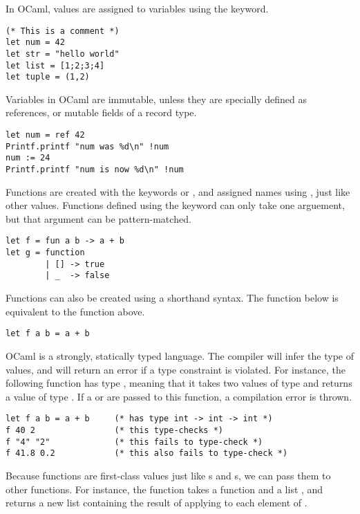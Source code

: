 In OCaml, values are assigned to variables using the 
keyword.

\begin{lstlisting}
(* This is a comment *)
let num = 42
let str = "hello world"
let list = [1;2;3;4]
let tuple = (1,2)
\end{lstlisting}

Variables in OCaml are immutable, unless they are specially defined as
references, or mutable fields of a record type.

\begin{lstlisting}
let num = ref 42
Printf.printf "num was %d\n" !num
num := 24
Printf.printf "num is now %d\n" !num
\end{lstlisting}

Functions are created with the keywords  or ,
and assigned names using , just like other values. Functions
defined using the  keyword can only take one arguement,
but that argument can be pattern-matched.

\begin{lstlisting}
let f = fun a b -> a + b
let g = function
        | [] -> true
        | _  -> false
\end{lstlisting}

Functions can also be created using a shorthand  syntax. The
function  below is equivalent to the function  above.

\begin{lstlisting}
let f a b = a + b
\end{lstlisting}

OCaml is a strongly, statically typed language. The compiler will
infer the type of values, and will return an error if a type
constraint is violated. For instance, the following function 
has type , meaning that it takes two values of
type  and returns a value of type . If a
 or  are passed to this function, a
compilation error is thrown.

\begin{lstlisting}
let f a b = a + b     (* has type int -> int -> int *)
f 40 2                (* this type-checks *)
f "4" "2"             (* this fails to type-check *)
f 41.8 0.2            (* this also fails to type-check *)
\end{lstlisting}

Because functions are first-class values just like s and
s, we can pass them to other functions. For instance, the
function  takes a function  and a list
, and returns a new list containing the result of applying
 to each element of .

